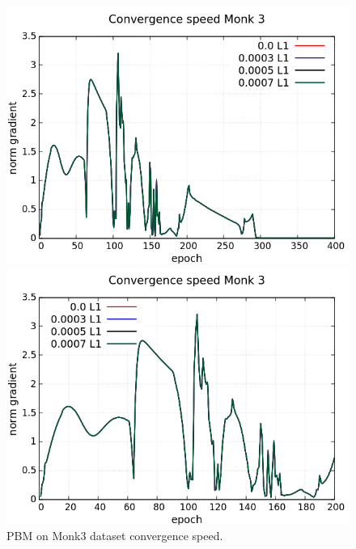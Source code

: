 \begin{figure}[H]
	\centering
	\begin{minipage}[t]{0.5\linewidth}
		\includegraphics[width=\linewidth]{data/PBM/Monk3/Monk3_PBM_CS_standard.png}
	\end{minipage}%
	\begin{minipage}[t]{0.5\linewidth}
		\includegraphics[width=\linewidth]{data/PBM/Monk3/Monk3_PBM_CS_zoom.png}
	\end{minipage}
	\caption{PBM on Monk3 dataset convergence speed.}
\end{figure}
